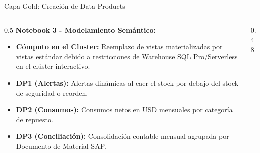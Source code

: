 \documentclass[aspectratio=169,10pt]{beamer}
\begin{document}
\begin{frame}{Capa Gold: Creación de Data Products}
    \begin{columns}
        \begin{column}{0.5\textwidth}
            \textbf{Notebook 3 - Modelamiento Semántico:}
            \begin{itemize}
                \setlength{\itemsep}{0.4em}
                \item \textbf{Cómputo en el Cluster:} Reemplazo de vistas materializadas por vistas estándar debido a restricciones de Warehouse SQL Pro/Serverless en el clúster interactivo.
                \item \textbf{DP1 (Alertas):} Alertas dinámicas al caer el stock por debajo del stock de seguridad o reorden.
                \item \textbf{DP2 (Consumos):} Consumos netos en USD mensuales por categoría de repuesto.
                \item \textbf{DP3 (Conciliación):} Consolidación contable mensual agrupada por Documento de Material SAP.
            \end{itemize}
        \end{column}
        \begin{column}{0.48\textwidth}
            \centering
        \end{column}
    \end{columns}
\end{frame}
\end{document}
